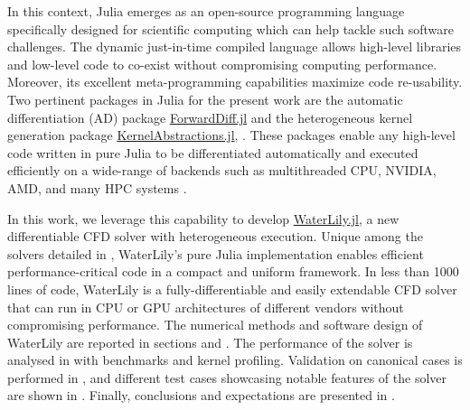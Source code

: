\documentclass[10pt,a4paper]{article}
\begin{document}
In this context, Julia \citep{Bezanson2017} emerges as an open-source programming language specifically designed for scientific computing which can help tackle such software challenges. The dynamic just-in-time compiled language allows high-level libraries and low-level code to co-exist without compromising computing performance. Moreover, its excellent meta-programming capabilities maximize code re-usability. Two pertinent packages in Julia for the present work are the automatic differentiation (AD) package \href{https://github.com/JuliaDiff/ForwardDiff.jl}{ForwardDiff.jl} and the heterogeneous kernel generation package \href{https://github.com/JuliaGPU/KernelAbstractions.jl}{KernelAbstractions.jl}, \citep{RevelsLubinPapamarkou2016,Churavy2023}. These packages enable any high-level code written in pure Julia to be differentiated automatically and executed efficiently on a wide-range of backends such as multithreaded CPU, NVIDIA, AMD, and many HPC systems \citep{Churavy2022}.

In this work, we leverage this capability to develop \href{https://github.com/WaterLily-jl/WaterLily.jl}{WaterLily.jl}, a new differentiable CFD solver with heterogeneous execution. Unique among the solvers detailed in , WaterLily's pure Julia implementation enables efficient performance-critical code in a compact and uniform framework. In less than 1000 lines of code, WaterLily is a fully-differentiable and easily extendable CFD solver that can run in CPU or GPU architectures of different vendors without compromising performance. The numerical methods and software design of WaterLily are reported in sections  and . The performance of the solver is analysed in  with benchmarks and kernel profiling. Validation on canonical cases is performed in , and different test cases showcasing notable features of the solver are shown in . Finally, conclusions and expectations are presented in .
\end{document}
